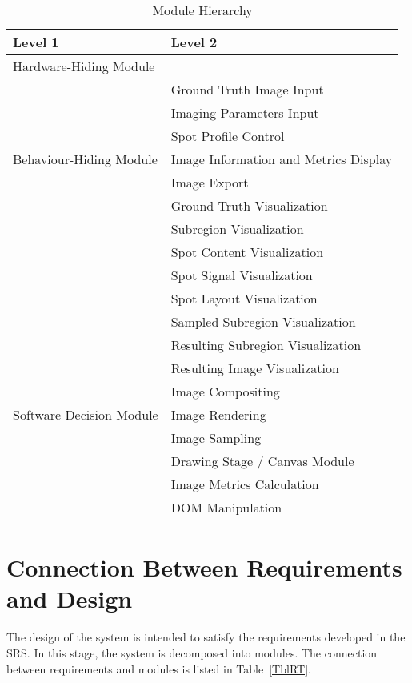 \documentclass[12pt, titlepage]{article}
\begin{document}
\begin{table}[h!]
\centering
\begin{tabular}{p{} p{}}
\toprule
\textbf{Level 1} & \textbf{Level 2}\\
\midrule

{Hardware-Hiding Module} & ~ \\
\midrule

\multirow{7}{0.3\textwidth}{Behaviour-Hiding Module}
& Ground Truth Image Input \\
& Imaging Parameters Input \\
& Spot Profile Control \\
& Image Information and Metrics Display \\
& Image Export \\
& Ground Truth Visualization \\
& Subregion Visualization \\
& Spot Content Visualization \\
& Spot Signal Visualization \\
& Spot Layout Visualization \\
& Sampled Subregion Visualization \\
& Resulting Subregion Visualization \\
& Resulting Image Visualization \\
\midrule

\multirow{3}{0.3\textwidth}{Software Decision Module}
& Image Compositing \\
& Image Rendering \\
& Image Sampling \\
& Drawing Stage / Canvas Module \\
& Image Metrics Calculation \\
& DOM Manipulation \\
\bottomrule

\end{tabular}
\caption{Module Hierarchy}
\label{TblMH}
\end{table}

\section{Connection Between Requirements and Design} \label{SecConnection}

The design of the system is intended to satisfy the requirements developed in
the SRS. In this stage, the system is decomposed into modules. The connection
between requirements and modules is listed in Table~\ref{TblRT}.
\end{document}
